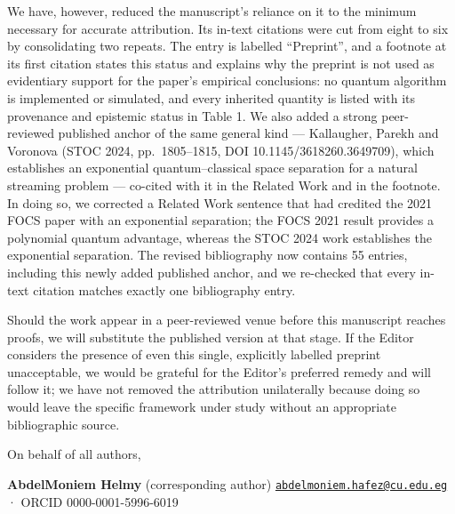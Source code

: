 \documentclass[
  11pt,
]{article}
\begin{document}
We have, however, reduced the manuscript's reliance on it to the minimum
necessary for accurate attribution. Its in-text citations were cut from
eight to six by consolidating two repeats. The entry is labelled
``Preprint'', and a footnote at its first citation states this status
and explains why the preprint is not used as evidentiary support for the
paper's empirical conclusions: no quantum algorithm is implemented or
simulated, and every inherited quantity is listed with its provenance
and epistemic status in Table 1. We also added a strong peer-reviewed
published anchor of the same general kind --- Kallaugher, Parekh and
Voronova (STOC 2024, pp.~1805--1815, DOI 10.1145/3618260.3649709), which
establishes an exponential quantum--classical space separation for a
natural streaming problem --- co-cited with it in the Related Work and
in the footnote. In doing so, we corrected a Related Work sentence that
had credited the 2021 FOCS paper with an exponential separation; the
FOCS 2021 result provides a polynomial quantum advantage, whereas the
STOC 2024 work establishes the exponential separation. The revised
bibliography now contains 55 entries, including this newly added
published anchor, and we re-checked that every in-text citation matches
exactly one bibliography entry.

Should the work appear in a peer-reviewed venue before this manuscript
reaches proofs, we will substitute the published version at that stage.
If the Editor considers the presence of even this single, explicitly
labelled preprint unacceptable, we would be grateful for the Editor's
preferred remedy and will follow it; we have not removed the attribution
unilaterally because doing so would leave the specific framework under
study without an appropriate bibliographic source.

On behalf of all authors,

\textbf{AbdelMoniem Helmy} (corresponding author)
\href{mailto:abdelmoniem.hafez@cu.edu.eg}{\nolinkurl{abdelmoniem.hafez@cu.edu.eg}}
· ORCID 0000-0001-5996-6019
\end{document}
